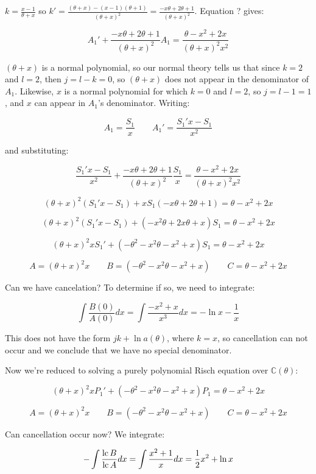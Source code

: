 $k = \frac{x-1}{\theta+x}$ so
$k' = \frac{(\theta+x) - (x-1)(\theta+1)}{(\theta+x)^2} = \frac{-x\theta + 2 \theta +1}{(\theta+x)^2}$.
Equation ? gives:

$$A_1' + \frac{-x\theta + 2 \theta +1}{(\theta+x)^2} A_1 = \frac{\theta - x^2 + 2x}{(\theta + x)^2 x^2}$$

$(\theta+x)$ is a normal polynomial, so our normal theory tells us that
since $k=2$ and $l=2$, then $j=l-k=0$, so $(\theta+x)$ does not appear
in the denominator of $A_1$.  Likewise, $x$ is a normal polynomial
for which $k=0$ and $l=2$, so $j=l-1 = 1$, and $x$ can appear in
$A_1$'s denominator.  Writing:

$$A_1 = \frac{S_1}{x} \qquad A_1' = \frac{S_1' x - S_1}{x^2}$$

and substituting:

$$\frac{S_1' x - S_1}{x^2} + \frac{-x\theta + 2 \theta +1}{(\theta+x)^2} \frac{S_1}{x} = \frac{\theta - x^2 + 2x}{(\theta + x)^2 x^2}$$

$$(\theta+x)^2 (S_1' x - S_1) + x S_1(-x\theta + 2 \theta +1) = \theta - x^2 + 2x$$

$$(\theta+x)^2 (S_1' x - S_1) + (-x^2\theta + 2 x \theta + x) S_1 = \theta - x^2 + 2x$$

$$(\theta+x)^2 x S_1' + (-\theta^2 -x^2\theta - x^2 + x) S_1 = \theta - x^2 + 2x$$

$$A = (\theta+x)^2 x \qquad B = (-\theta^2 -x^2\theta - x^2 + x) \qquad C = \theta - x^2 + 2x$$

Can we have cancelation?  To determine if so, we need to integrate:

$$\int \frac{B(0)}{A(0)} dx = \int \frac{-x^2+x}{x^3} dx = - \ln x - \frac{1}{x}$$

This does not have the form $jk + \ln a(\theta)$, where $k=x$, so cancellation
can not occur and we conclude that we have no special denominator.

Now we're reduced to solving a purely polynomial Risch equation over ${\mathbb C}(\theta)$:

$$(\theta+x)^2 x P_1' + (-\theta^2 -x^2\theta - x^2 + x) P_1 = \theta - x^2 + 2x$$

$$A = (\theta+x)^2 x \qquad B = (-\theta^2 -x^2\theta - x^2 + x) \qquad C = \theta - x^2 + 2x$$

Can cancellation occur now?  We integrate:

$$- \int \frac{{\rm lc\,} B}{{\rm lc\,} A} dx = \int \frac{x^2+1}{x} dx = \frac{1}{2}x^2 + \ln x$$



